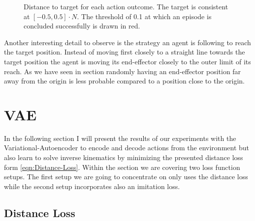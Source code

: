 \begin{figure}
\begin{center}
{            \label{fig:SAC_baseline_inference/distance_15}
            }
    \end{center}
    \caption[SAC baseline inference]{Distance to target for each action outcome. The target is consistent at $[-0.5, 0.5] \cdot N$. The threshold of 0.1 at which an episode is concluded successfully is drawn in red.} 
    \label{fig:SAC_baseline_inference_distance}
\end{figure}
Another interesting detail to observe is the strategy an agent is following to reach the target position. Instead of moving first closely to a straight line towards the target position the agent is moving its end-effector closely to the outer limit of its reach. As we have seen in section  randomly having an end-effector position far away from the origin is less probable compared to a position close to the origin. 

\section{VAE}

In the following section I will present the results of our experiments with the Variational-Autoencoder to encode and decode actions from the environment but also learn to solve inverse kinematics by minimizing the presented distance loss form \eqref{eqn:Distance-Loss}. Within the section we are covering two loss function setups. The first setup we are going to concentrate on only uses the distance loss while the second setup incorporates also an imitation loss.

\subsection{Distance Loss}

